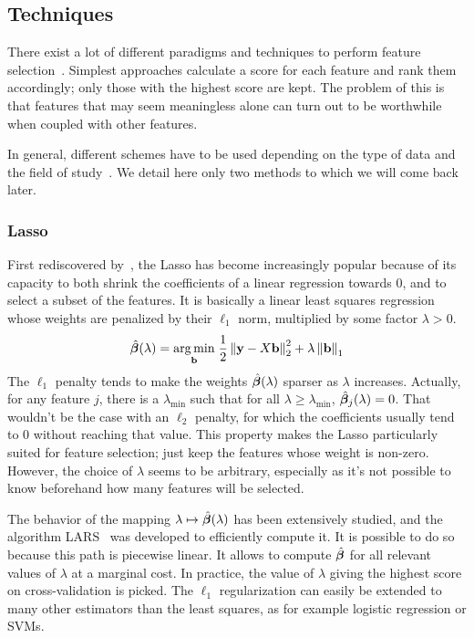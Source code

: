 \subsection{Techniques}\label{subsec:fst}

There exist a lot of different paradigms and techniques
to perform feature selection~\citep{intro_fs, fs_for_classification_a_review}.
Simplest approaches calculate a score for each feature and rank them accordingly;
only those with the highest score are kept.
The problem of this is that features that may seem meaningless alone
can turn out to be worthwhile when coupled with other features.

In general,
different schemes have to be used depending
on the type of data and the field of study~\citep{fs_text_classification, gene_selection_cancer_svm, fs_for_classification}.
We detail here only two methods to which we will come back later.

\subsubsection{Lasso}\label{subsubsec:lasso}

First rediscovered by~\cite{lasso},
the Lasso has become increasingly popular because of its capacity to both shrink
the coefficients of a linear regression towards $0$, and to select a subset of the features.
It is basically a linear least squares regression whose weights are penalized by their $\ell_1$ norm,
multiplied by some factor $\lambda > 0$.
%
\begin{equation}\label{eq:lasso}
    \hat{\bm{\beta}}(\lambda) =
    \underset{\mathbf{b}}{\operatorname*{arg\,min}}\;
    \frac{1}{2}\left\lVert\mathbf{y} - X\mathbf{b}\right\rVert_2^2 + \lambda\left\lVert\mathbf{b}\right\rVert_1
\end{equation}
%
The $\ell_1$ penalty tends to make the weights $\hat{\bm{\beta}}(\lambda)$ sparser as $\lambda$ increases.
Actually, for any feature $j$,
there is a $\lambda_{\min}$ such that for all $\lambda \geq \lambda_{\min}$,
$\hat{\bm{\beta}}_j(\lambda) = 0$.
That wouldn't be the case with an $\ell_2$ penalty,
for which the coefficients usually tend to $0$ without reaching that value.
This property makes the Lasso particularly suited for feature selection;
just keep the features whose weight is non-zero.
However, the choice of $\lambda$ seems to be arbitrary,
especially as it's not possible to know beforehand how many features will be selected.

The behavior of the mapping $\lambda \mapsto \hat{\bm{\beta}}(\lambda)$ has been extensively studied,
and the algorithm LARS~\citep{lars} was developed to efficiently compute it.
It is possible to do so because this path is piecewise linear.
It allows to compute $\hat{\bm{\beta}}$ for all relevant values of $\lambda$ at a marginal cost.
In practice, the value of $\lambda$ giving the highest score on cross-validation is picked.
The $\ell_1$ regularization can easily be extended to many other estimators than the least squares,
as for example logistic regression or SVMs.

